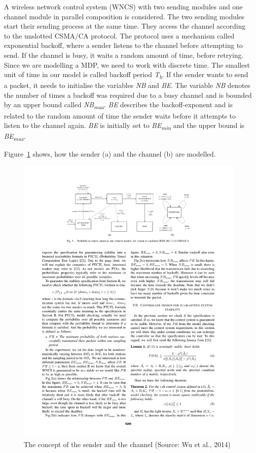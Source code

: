 \documentclass[
a4paper,
12pt
]{scrartcl}
\begin{document}
\par A wireless network control system (WNCS) with two sending modules and one channel module in parallel composition is considered. The two sending modules start their sending process at the same time. They access the channel according to the unslotted CSMA/CA protocol. The protocol uses a mechanism called exponential backoff, where a sender listens to the channel before attempting to send. If the channel is busy, it waits a random amount of time, before retrying. Since we are modelling a MDP, we need to work with discrete time. The smallest unit of time in our model is called backoff period \textit{T\textsubscript{b}}. If the sender wants to send a packet, it needs to initialise the variables \textit{NB} and \textit{BE}. The variable \textit{NB} denotes the number of times a backoff was required due to a busy channel and is bounded by an upper bound called \textit{NB\textsubscript{max}}. \textit{BE} describes the backoff-exponent and is related to the random amount of time the sender waits before it attempts to listen to the channel again. \textit{BE} is initially set to \textit{BE\textsubscript{min}} and the upper bound is \textit{BE\textsubscript{max}}.

Figure~\ref{IEEE802:pdf} \cite{stability} shows, how the sender (a) and the channel (b) are modelled.

\begin{figure}[H]
  \centering
\includegraphics[page=1]{data/stability_cropped.pdf}
\caption{The concept of the sender and the channel (Source: Wu et al., 2014)}
\label{IEEE802:pdf}
\end{figure}
\end{document}
